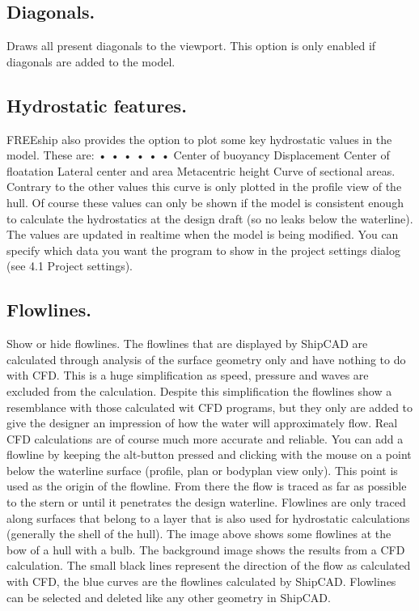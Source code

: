 \documentclass[12pt]{article}
\begin{document}
\subsection{Diagonals.}
Draws all present diagonals to the viewport. This option is only enabled if diagonals are added to
the model.

\subsection{Hydrostatic features.}
FREEship also provides the option to plot some key hydrostatic values in the model. These are:
•
•
•
•
•
•
Center of buoyancy
Displacement
Center of floatation
Lateral center and area
Metacentric height
Curve of sectional areas. Contrary to the other values this curve is only plotted in the profile view
of the hull. Of course these values can only be shown if the model is consistent enough to
calculate the hydrostatics at the design draft (so no leaks below the waterline). The values are
updated in realtime when the model
is being modified. You can specify
which data you want the program to
show in the project settings dialog
(see 4.1 Project settings).

\subsection{Flowlines.}
Show or hide flowlines. The flowlines that are displayed by ShipCAD are calculated through
analysis of the surface geometry only and have nothing to do with CFD. This is a huge simplification
as speed, pressure and waves are excluded from the calculation. Despite this simplification the
flowlines show a resemblance with those calculated wit CFD programs, but they only are added to
give the designer an impression of how the water will approximately flow. Real CFD calculations are
of course much more accurate and
reliable. You can add a flowline by
keeping the alt-button pressed and
clicking with the mouse on a point below
the waterline surface (profile, plan or
bodyplan view only). This point is used as
the origin of the flowline. From there the
flow is traced as far as possible to the
stern or until it penetrates the design
waterline. Flowlines are only traced along
surfaces that belong to a layer that is
also used for hydrostatic calculations (generally the shell of the hull). The image above shows some
flowlines at the bow of a hull with a bulb. The background image shows the results from a CFD
calculation. The small black lines represent the direction of the flow as calculated with CFD, the blue
curves are the flowlines calculated by ShipCAD. Flowlines can be selected and deleted like any
other geometry in ShipCAD.
\end{document}
